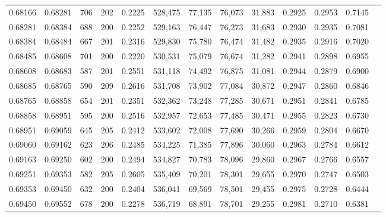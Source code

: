 \begin{tabular}{rrrrrrrrrrrrr}
0.68166 & 0.68281 &   706 & 202 &                                     0.2225 & 528,475 &  77,135 &  76,073 &  31,883 & 0.2925 & 0.2953 & 0.7145 \\
0.68281 & 0.68384 &   688 & 200 &                                     0.2252 & 529,163 &  76,447 &  76,273 &  31,683 & 0.2930 & 0.2935 & 0.7081 \\
0.68384 & 0.68484 &   667 & 201 &                                     0.2316 & 529,830 &  75,780 &  76,474 &  31,482 & 0.2935 & 0.2916 & 0.7020 \\
0.68485 & 0.68608 &   701 & 200 &                                     0.2220 & 530,531 &  75,079 &  76,674 &  31,282 & 0.2941 & 0.2898 & 0.6955 \\
0.68608 & 0.68683 &   587 & 201 &                                     0.2551 & 531,118 &  74,492 &  76,875 &  31,081 & 0.2944 & 0.2879 & 0.6900 \\
0.68685 & 0.68765 &   590 & 209 &                                     0.2616 & 531,708 &  73,902 &  77,084 &  30,872 & 0.2947 & 0.2860 & 0.6846 \\
0.68765 & 0.68858 &   654 & 201 &                                     0.2351 & 532,362 &  73,248 &  77,285 &  30,671 & 0.2951 & 0.2841 & 0.6785 \\
0.68858 & 0.68951 &   595 & 200 &                                     0.2516 & 532,957 &  72,653 &  77,485 &  30,471 & 0.2955 & 0.2823 & 0.6730 \\
0.68951 & 0.69059 &   645 & 205 &                                     0.2412 & 533,602 &  72,008 &  77,690 &  30,266 & 0.2959 & 0.2804 & 0.6670 \\
0.69060 & 0.69162 &   623 & 206 &                                     0.2485 & 534,225 &  71,385 &  77,896 &  30,060 & 0.2963 & 0.2784 & 0.6612 \\
0.69163 & 0.69250 &   602 & 200 &                                     0.2494 & 534,827 &  70,783 &  78,096 &  29,860 & 0.2967 & 0.2766 & 0.6557 \\
0.69251 & 0.69353 &   582 & 205 &                                     0.2605 & 535,409 &  70,201 &  78,301 &  29,655 & 0.2970 & 0.2747 & 0.6503 \\
0.69353 & 0.69450 &   632 & 200 &                                     0.2404 & 536,041 &  69,569 &  78,501 &  29,455 & 0.2975 & 0.2728 & 0.6444 \\
0.69450 & 0.69552 &   678 & 200 &                                     0.2278 & 536,719 &  68,891 &  78,701 &  29,255 & 0.2981 & 0.2710 & 0.6381 \\

\end{tabular}
